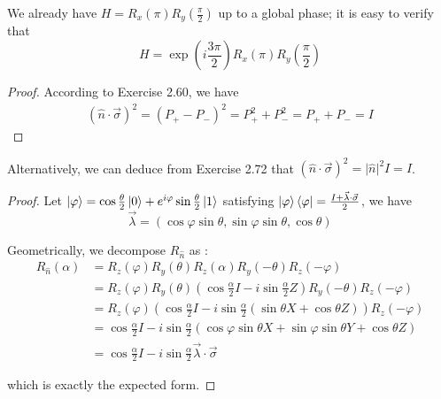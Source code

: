 \documentclass[../main.tex]{subfiles}
\begin{document}
\bigskip
\begin{exercise}
\end{exercise}
We already have $H=R_x(\pi)R_y(\frac{\pi}{2})$ up to a global phase; it is easy to verify that
\begin{equation*}
    H=\exp(i\frac{3\pi}{2})R_x(\pi)R_y(\frac{\pi}{2})
\end{equation*}

\bigskip
\begin{exercise}
\end{exercise}
\begin{proof}
According to Exercise 2.60, we have
\begin{align*}
    (\hat{n}\cdot\Vec{\sigma})^2=(P_+-P_-)^2=P_+^2+P_-^2=P_++P_-=I
\end{align*}
\end{proof}
\begin{remark}
Alternatively, we can deduce from Exercise 2.72 that $(\hat{n}\cdot\Vec{\sigma})^2=\lvert\hat{n}\rvert^2 I=I$.
\end{remark}

\bigskip
\begin{exercise}
\end{exercise}
\begin{proof}
Let $\ket{\varphi}=\cos{\frac{\theta}{2}}\ket{0}+e^{i\varphi}\sin{\frac{\theta}{2}}\ket{1}$ satisfying $\ket{\varphi}\bra{\varphi}=\frac{I+\Vec{\lambda}\cdot\Vec{\sigma}}{2}$, we have
\begin{equation*}
    \Vec{\lambda}=(\cos\varphi\sin\theta, \sin\varphi\sin\theta, \cos\theta)
\end{equation*}

Geometrically, we decompose $R_{\hat{n}}$ as :
\begin{align*}
    R_{\hat{n}}(\alpha)
    &= R_z(\varphi)R_y(\theta)R_z(\alpha)R_y(-\theta)R_z(-\varphi) \\
    &= R_z(\varphi)R_y(\theta)\left(\cos\frac{\alpha}{2}I-i\sin{\frac{\alpha}{2}}Z\right)R_y(-\theta)R_z(-\varphi) \\
    &= R_z(\varphi)\left(\cos\frac{\alpha}{2}I-i\sin{\frac{\alpha}{2}}(\sin\theta X+\cos\theta Z)\right)R_z(-\varphi) \\
    &= \cos\frac{\alpha}{2}I-i\sin\frac{\alpha}{2}(\cos\varphi\sin\theta X+\sin\varphi\sin\theta Y+\cos\theta Z) \\
    &= \cos\frac{\alpha}{2}I-i\sin\frac{\alpha}{2}\Vec{\lambda}\cdot\Vec{\sigma}
\end{align*}

which is exactly the expected form.
\end{proof}
\end{document}
